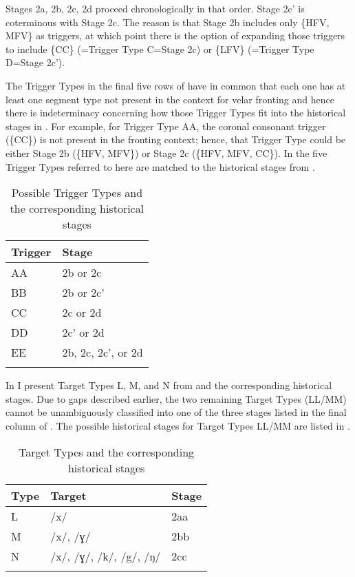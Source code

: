 Stages 2a, 2b, 2c, 2d proceed chronologically in that order. Stage 2c{}' is coterminous with Stage 2c. The reason is that Stage 2b includes only \{HFV, MFV\} as triggers, at which point there is the option of expanding those triggers to include \{CC\} (=Trigger Type C=Stage 2c) or \{LFV\} (=Trigger Type D=Stage 2c{}').

The Trigger Types in the final five rows of  have in common that each one has at least one segment type not present in the context for velar fronting and hence there is indeterminacy concerning how those Trigger Types fit into the historical stages in . For example, for Trigger Type AA, the coronal consonant trigger (\{CC\}) is not present in the fronting context; hence, that Trigger Type could be either Stage 2b (\{HFV, MFV\}) or Stage 2c (\{HFV, MFV, CC\}). In  the five Trigger Types referred to here are matched to the historical stages from .

\begin{table}
\caption{Possible Trigger Types and the corresponding historical stages\label{tab:12.24}}
\begin{tabular}{ll}
\lsptoprule
Trigger & Stage\\\midrule
AA & 2b or 2c\\
BB & 2b or 2c'\\
CC & 2c or 2d\\
DD & 2c' or 2d\\
EE & 2b, 2c, 2c', or 2d\\
\lspbottomrule
\end{tabular}
\end{table}

In  I present Target Types L, M, and N from  and the corresponding historical stages. Due to gaps described earlier, the two remaining Target Types (LL/MM) cannot be unambiguously classified into one of the three stages listed in the final column of . The possible historical stages for Target Types LL/MM are listed in .

\begin{table}
\caption{Target Types and the corresponding historical stages\label{tab:12.25}}
\begin{tabular}{lll}
\lsptoprule
Type & Target & Stage\\\midrule
L & /x/ & 2aa\\
M & /x/, /ɣ/ & 2bb\\
N & /x/, /ɣ/, /k/, /g/, /ŋ/ & 2cc\\
\lspbottomrule
\end{tabular}
\end{table}

